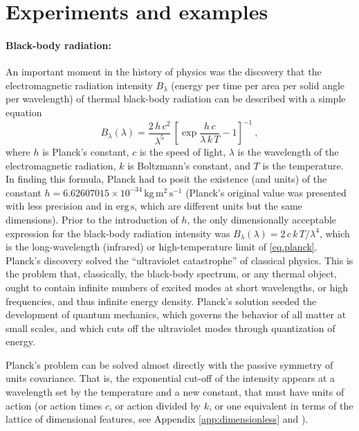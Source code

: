 \documentclass[accepted]{article}
\newcommand{\unit}[1]{\mathrm{#1}}
\newcommand{\kg}{\unit{kg}}
\newcommand{\m}{\unit{m}}
\newcommand{\s}{\unit{s}}
\begin{document}
\section{Experiments and examples}\label{sec:experiments}

\paragraph{Black-body radiation:}
An important moment in the history of physics was the discovery that the electromagnetic radiation intensity $B_\lambda$ (energy per time per area per solid angle per wavelength) of thermal black-body radiation can be described with a simple equation \citep{planck}
\begin{equation} \label{eq.planck}
    B_\lambda(\lambda) = \frac{2\,h\,c^2}{\lambda^5}\,\left[\exp\frac{h\,c}{\lambda\,k\,T} - 1\right]^{-1} ~,
\end{equation}
where $h$ is Planck's constant,
$c$ is the speed of light,
$\lambda$ is the wavelength of the electromagnetic radiation,
$k$ is Boltzmann's constant,
and $T$ is the temperature.
In finding this formula, Planck had to posit the existence (and units) of the constant $h=6.62607015\times 10^{-34}\,\kg\,\m^2\,\s^{-1}$ (Planck's original value was presented with less precision and in $\mathrm{erg}\,\s$, which are different units but the same dimensions).
Prior to the introduction of $h$, the only dimensionally acceptable expression for the black-body radiation intensity was $B_\lambda(\lambda)=2\,c\,k\,T/\lambda^4$, which is the long-wavelength (infrared) or high-temperature limit of \eqref{eq.planck}.
Planck's discovery solved the ``ultraviolet catastrophe'' of classical physics.
This is the problem that, classically, the black-body spectrum, or any thermal object, ought to contain infinite numbers of excited modes at short wavelengths, or high frequencies, and thus infinite energy density.
Planck's solution seeded the development of quantum mechanics, which governs the behavior of all matter at small scales, and which cuts off the ultraviolet modes through quantization of energy.

Planck's problem can be solved almost directly with the passive symmetry of units covariance.
That is, the exponential cut-off of the intensity appears at a wavelength set by the temperature and a new constant, that must have units of action (or action times $c$, or action divided by $k$, or one equivalent in terms of the lattice of dimensional features, see Appendix \ref{app:dimensionless} and \citealt{villar2022dimensionless}).
\end{document}
